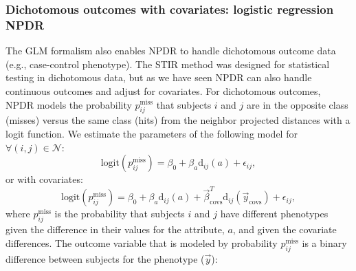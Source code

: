 \documentclass[10pt]{article}
\begin{document}
\subsubsection{Dichotomous outcomes with covariates: logistic regression NPDR}
The GLM formalism also enables NPDR to handle dichotomous outcome data (e.g., case-control phenotype). The STIR method was designed for statistical testing in dichotomous data, but as we have seen NPDR can also handle continuous outcomes and adjust for covariates.
For dichotomous outcomes, NPDR models the probability $p^{\text{miss}}_{ij}$ that subjects $i$ and $j$ are in the opposite class (misses) versus the same class (hits) from the neighbor projected distances with a logit function. We estimate the parameters of the following model for $\forall(i,j) \in \mathcal{N}$:   
\begin{equation}\label{eq:logit_nocovar}
\text{logit}(p^{\text{miss}}_{ij}) = \beta_0 + \beta_a \text{d}_{ij}(a) + \epsilon_{ij},   
\end{equation}
or with covariates:
\begin{equation}\label{eq:too_logit}
\text{logit}(p^{\text{miss}}_{ij}) = \beta_0 + \beta_a \text{d}_{ij}(a) + \vec{\beta}^{T}_{\text{covs}} \text{d}_{ij}(\vec{y}_{\text{covs}}) + \epsilon_{ij},   
\end{equation}
where $p^{\text{miss}}_{ij}$ is the probability that subjects $i$ and $j$ have different phenotypes given the difference in their values for the attribute, $a$, and given the covariate differences.
The outcome variable that is modeled by probability $p^{\text{miss}}_{ij}$ is a binary difference between subjects for the phenotype ($\vec{y}$):
   
\end{document}
